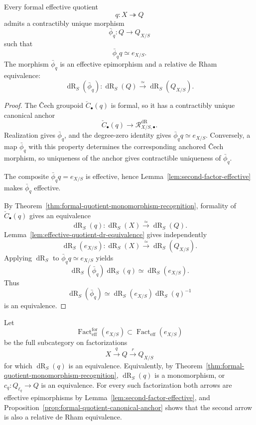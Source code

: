 \begin{proposition}
\label{prop:formal-quotient-canonical-anchor}
Every formal effective quotient
\[
    q:X\twoheadrightarrow Q
\]
admits a contractibly unique morphism
\[
    \bar\phi_q:Q\longrightarrow Q_{X/S}
\]
such that
\[
    \bar\phi_q q\simeq e_{X/S}.
\]
The morphism $\bar\phi_q$ is an effective epimorphism and a relative de Rham
equivalence:
\[
    \operatorname{dR}_S(\bar\phi_q):
    \operatorname{dR}_S(Q)\xrightarrow{\simeq}\operatorname{dR}_S(Q_{X/S}).
\]
\end{proposition}

\begin{proof}
The \v{C}ech groupoid $\check C_\bullet(q)$ is formal, so it has a
contractibly unique canonical anchor
\[
    \check C_\bullet(q)\longrightarrow \mathcal R^{\mathrm{dR}}_{X/S,\bullet}.
\]
Realization gives $\bar\phi_q$, and the degree-zero identity gives
$\bar\phi_q q\simeq e_{X/S}$.  Conversely, a map $\bar\phi_q$ with this property
determines the corresponding anchored \v{C}ech morphism, so uniqueness of the
anchor gives contractible uniqueness of $\bar\phi_q$.

The composite $\bar\phi_q q=e_{X/S}$ is effective, hence
Lemma~\ref{lem:second-factor-effective} makes $\bar\phi_q$ effective.

By Theorem~\ref{thm:formal-quotient-monomorphism-recognition},
formality of $\check C_\bullet(q)$ gives an equivalence
\[
    \operatorname{dR}_S(q):\operatorname{dR}_S(X)\xrightarrow{\simeq}\operatorname{dR}_S(Q).
\]
Lemma~\ref{lem:effective-quotient-dr-equivalence} gives independently
\[
    \operatorname{dR}_S(e_{X/S}):
    \operatorname{dR}_S(X)\xrightarrow{\simeq}\operatorname{dR}_S(Q_{X/S}).
\]
Applying $\operatorname{dR}_S$ to $\bar\phi_q q\simeq e_{X/S}$ yields
\[
    \operatorname{dR}_S(\bar\phi_q)\operatorname{dR}_S(q)\simeq \operatorname{dR}_S(e_{X/S}).
\]
Thus
\[
    \operatorname{dR}_S(\bar\phi_q)
    \simeq
    \operatorname{dR}_S(e_{X/S})\operatorname{dR}_S(q)^{-1}
\]
is an equivalence.
\end{proof}

\begin{definition}
\label{def:formal-infinitesimal-quotient-factorizations}
Let
\[
    \operatorname{Fact}^{\mathrm{for}}_{\mathrm{eff}}
    (e_{X/S})
    \subset
    \operatorname{Fact}_{\mathrm{eff}}(e_{X/S})
\]
be the full subcategory on factorizations
\[
    X\xrightarrow{q}Q\xrightarrow{r}Q_{X/S}
\]
for which $\operatorname{dR}_S(q)$ is an equivalence.  Equivalently, by
Theorem~\ref{thm:formal-quotient-monomorphism-recognition},
$\operatorname{dR}_S(q)$ is a monomorphism, or
$c_q:Q_{\ell_q}\to Q$ is an equivalence.
For every such factorization both arrows are effective epimorphisms by
Lemma~\ref{lem:second-factor-effective}, and
Proposition~\ref{prop:formal-quotient-canonical-anchor} shows that the second
arrow is also a relative de Rham equivalence.
\end{definition}

